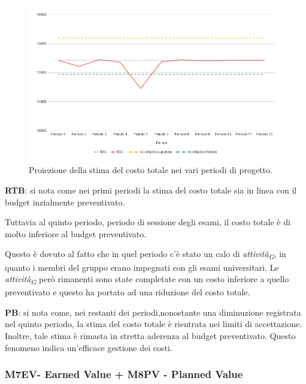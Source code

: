 \begin{figure}[H]
    \centering
    \includegraphics[width=1\textwidth]{../Images/PianoDiQualifica/M2EAC.png}
    \caption{Proiezione della stima del costo totale nei vari periodi di progetto.}
    \label{fig:2}
\end{figure}

\vspace{0.2cm}

\textbf{RTB}: si nota come nei primi periodi la stima del costo totale sia in linea con il budget inzialmente preventivato.

Tuttavia al quinto periodo, periodo di sessione degli esami, il costo totale è di molto inferiore al budget preventivato.

Questo è dovuto al fatto che in quel periodo c'è stato un calo di \textit{attività}\textsubscript{\textit{G}}, in quanto i membri del gruppo erano impegnati con gli esami universitari. Le \textit{attività}\textsubscript{\textit{G}} però rimanenti sono state completate con un costo inferiore a quello preventivato e questo ha portato ad una riduzione del costo totale.\\
\vspace{0.2cm}

\textbf{PB}: si nota come, nei restanti dei periodi,nonostante una diminuzione registrata nel quinto periodo, la stima del costo totale è rientrata nei limiti di accettazione. Inoltre, tale stima è rimasta in stretta aderenza al budget preventivato. Questo fenomeno indica un’efficace gestione dei costi.


\subsubsection{M7EV- Earned Value + M8PV - Planned Value} 

